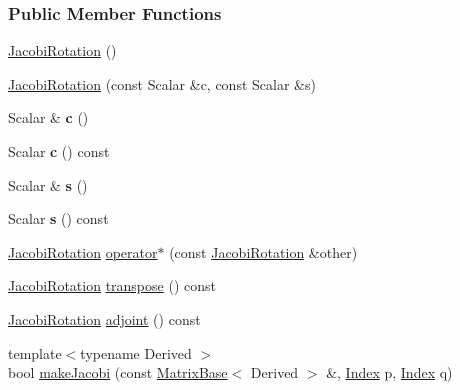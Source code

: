 \subsubsection*{Public Member Functions}
\begin{DoxyCompactItemize}
\item 
\hyperlink{group___jacobi___module_a38fec2c4da529ef3d05ff37b848b4227}{Jacobi\+Rotation} ()
\item 
\hyperlink{group___jacobi___module_a3e8b5dc0a56f7a2d0f788b1ccb1547cb}{Jacobi\+Rotation} (const Scalar \&c, const Scalar \&s)
\item 
\mbox{\label{group___jacobi___module_af1c132146bc93a872b799bc57d9ced50}} 
Scalar \& {\bfseries c} ()
\item 
\mbox{\label{group___jacobi___module_a1cc768e0ad5492a5656791cb45194184}} 
Scalar {\bfseries c} () const
\item 
\mbox{\label{group___jacobi___module_a2c7a08e2d27875fd770d489317746969}} 
Scalar \& {\bfseries s} ()
\item 
\mbox{\label{group___jacobi___module_ae6f58fffecb41adb8d037c385b856628}} 
Scalar {\bfseries s} () const
\item 
\hyperlink{group___jacobi___module_class_eigen_1_1_jacobi_rotation}{Jacobi\+Rotation} \hyperlink{group___jacobi___module_ada8389f291839964d7b481464f0e4e94}{operator$\ast$} (const \hyperlink{group___jacobi___module_class_eigen_1_1_jacobi_rotation}{Jacobi\+Rotation} \&other)
\item 
\hyperlink{group___jacobi___module_class_eigen_1_1_jacobi_rotation}{Jacobi\+Rotation} \hyperlink{group___jacobi___module_ab40e9cdc4582593511e57ee896e055a2}{transpose} () const
\item 
\hyperlink{group___jacobi___module_class_eigen_1_1_jacobi_rotation}{Jacobi\+Rotation} \hyperlink{group___jacobi___module_a89c8ea615f8fa77ddd5810a1e5fde4da}{adjoint} () const
\item 
{\footnotesize template$<$typename Derived $>$ }\\bool \hyperlink{group___jacobi___module_a69076401f22e883dc76b6ff9074ac669}{make\+Jacobi} (const \hyperlink{group___core___module_class_eigen_1_1_matrix_base}{Matrix\+Base}$<$ Derived $>$ \&, \hyperlink{namespace_eigen_a62e77e0933482dafde8fe197d9a2cfde}{Index} p, \hyperlink{namespace_eigen_a62e77e0933482dafde8fe197d9a2cfde}{Index} q)

\end{DoxyCompactItemize}
